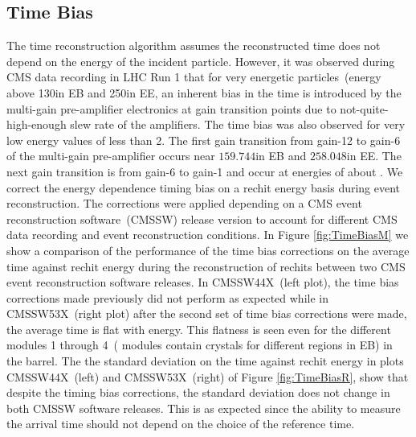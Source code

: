 \subsection{Time Bias}
The time reconstruction algorithm assumes the reconstructed time does not depend on the energy of the incident particle. However, it was observed during CMS data recording in LHC Run 1 that for very energetic particles~(energy above 130\GeV in EB and 250\GeV in EE, an inherent bias in the time is introduced by the multi-gain pre-amplifier electronics at gain transition points due to not-quite-high-enough slew rate of the amplifiers. The time bias was also observed for very low energy values of less than 2\GeV. The first gain transition from gain-12 to gain-6 of the multi-gain pre-amplifier occurs near  $159.744$\GeV in EB and $258.048$\GeV in EE. The next gain transition is from gain-6 to gain-1 and occur at energies of about \TeV.
\newline
We correct the energy dependence timing bias on a rechit energy basis during event reconstruction. The corrections were applied depending on a CMS event reconstruction software~(CMSSW) release version to account for different CMS data recording and event reconstruction conditions. In Figure \ref{fig:TimeBiasM} we show a comparison of the performance of the time bias corrections on the average time against rechit energy during the reconstruction of rechits between two CMS event reconstruction software releases. In CMSSW44X~(left plot), the time bias corrections made previously did not perform as expected while in CMSSW53X~(right plot) after the second set of time bias corrections were made, the average time is flat with energy. This flatness is seen even for the different modules 1 through 4~( modules contain crystals for different regions in EB) in the barrel.
\newline 
The the standard deviation on the time  against rechit energy in plots CMSSW44X~(left) and CMSSW53X~(right) of Figure \ref{fig:TimeBiasR}, show that despite the timing bias corrections, the standard deviation does not change in both CMSSW software releases. This is as expected since the ability to measure the arrival time should not depend on the choice of the reference time.  

